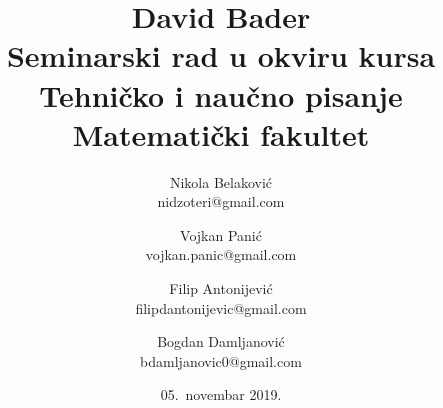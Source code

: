 \documentclass[a4paper]{article}
\begin{document}
\title{David Bader\\ \small{Seminarski rad u okviru kursa\\Tehničko i naučno pisanje\\ Matematički fakultet}}

\author{Nikola Belaković \\ nidzoteri@gmail.com \and
 Vojkan Panić \\ vojkan.panic@gmail.com \and
 Filip Antonijević \\ filipdantonijevic@gmail.com \and
 Bogdan Damljanović \\  bdamljanovic0@gmail.com } 
\date{05.~novembar 2019.}


\maketitle
\end{document}
